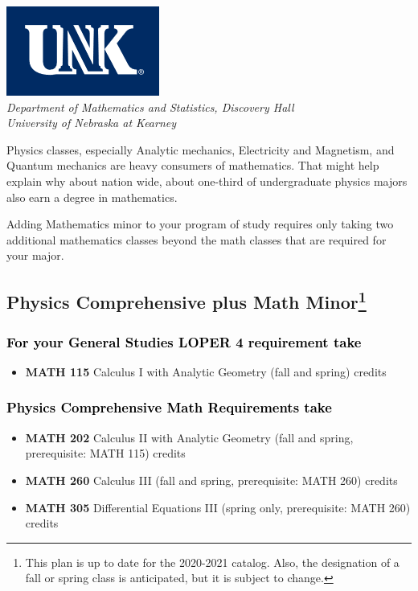 \documentclass[9pt]{article}
\begin{document}
\newpage

\begin{flushleft}
\includegraphics[scale=0.25]{unk-logo}\\
 \emph{\textcolor{unkblue}{Department of Mathematics and Statistics, Discovery Hall}} \\
  \emph{\textcolor{unkblue}{University of Nebraska at Kearney}}
\end{flushleft}

\noindent Physics classes, especially Analytic mechanics, Electricity and Magnetism, and Quantum mechanics are heavy consumers of mathematics.  That might help explain why about nation wide, about one-third of undergraduate physics majors also earn a degree in mathematics.

 Adding Mathematics minor to your program of study requires only taking two additional mathematics classes beyond the math classes that are required for your major.



\subsection*{\textbf{\textcolor{unkblue}{Physics  Comprehensive plus Math Minor\footnote[1]{This plan is up to date for the 2020-2021 catalog. Also, the designation of a fall or spring class is anticipated, but it is subject to change.
}}}}





\subsubsection*{\textcolor{black}{For  your General Studies LOPER 4 requirement take}}
\begin{itemize}
\item \textbf{MATH 115} Calculus I with Analytic Geometry (fall and spring)  credits
\end{itemize}


\subsubsection*{\textcolor{black}{Physics Comprehensive Math Requirements take}}
\begin{itemize}
 \item \textbf{MATH 202} Calculus II with Analytic Geometry (fall and spring,  prerequisite: MATH 115)  credits
 \item \textbf{MATH 260} Calculus III (fall and spring,  prerequisite: MATH 260)  credits
 \item \textbf{MATH 305} Differential Equations III (spring only,  prerequisite: MATH 260)  credits
\end{itemize}
\end{document}
